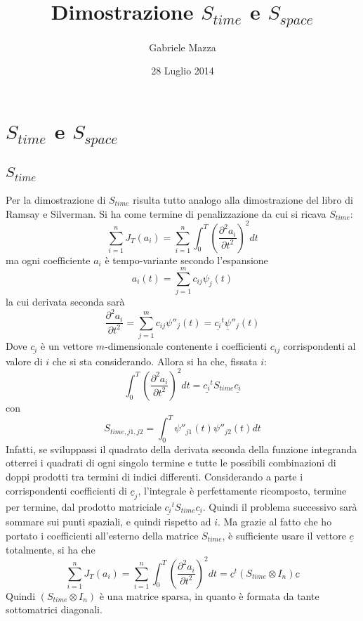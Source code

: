 \documentclass[a4paper,12pt]{report}							%
\date{28 Luglio 2014}
\author{Gabriele Mazza}
\title{Dimostrazione $S_{time}$ e $S_{space}$}
\begin{document}

\chapter{$S_{time}$ e $S_{space}$}

\section{$S_{time}$}
Per la dimostrazione di $S_{time}$ risulta tutto analogo alla dimostrazione del libro di Ramsay e Silverman.
\newline
Si ha come termine di penalizzazione da cui si ricava $S_{time}$:
$$
\sum_{i=1}^n J_T(a_i)=\sum_{i=1}^n \int_0^T (\frac{\partial^2a_i}{\partial t^2})^2 dt
$$
ma ogni coefficiente $a_i$ è tempo-variante secondo l'espansione
$$
a_i(t)=\sum_{j=1}^m c_{ij}\psi_j(t)
$$
la cui derivata seconda sarà
$$
\frac{\partial^2a_i}{\partial t^2}=\sum_{j=1}^m c_{ij}\psi''_j(t)= \underline{c_i}^t\underline{\psi}''_j(t) 
$$
Dove $\underline{c_i}$ è un vettore $m$-dimensionale contenente i coefficienti $c_{ij}$ corrispondenti al valore di $i$ che si sta considerando.
\newline
Allora si ha che, fissata $i$:
$$
\int_0^T (\frac{\partial^2a_i}{\partial t^2})^2 dt = \underline{c_i}^t S_{time} \underline{c_i}
$$
con
$$
S_{time,j1,j2}=\int_0^T\psi''_{j1}(t)\psi''_{j2}(t)dt
$$
Infatti, se sviluppassi il quadrato della derivata seconda della funzione integranda otterrei i quadrati
di ogni singolo termine e tutte le possibili combinazioni di doppi prodotti tra termini di indici differenti. Considerando a parte i corrispondenti coefficienti di $\underline{c}_j$, l'integrale è perfettamente ricomposto, termine per termine, dal prodotto matriciale $\underline{c_i}^t S_{time} \underline{c_i}$.
\newline
\newline
Quindi il problema successivo sarà sommare sui punti spaziali, e quindi rispetto ad $i$. Ma grazie al fatto che ho portato i coefficienti all'esterno della matrice $S_{time}$, è sufficiente usare il vettore $\underline{c}$ totalmente, si ha che
$$
\sum_{i=1}^n J_T(a_i)=\sum_{i=1}^n \int_0^T (\frac{\partial^2a_i}{\partial t^2})^2 dt=\underline{c}^t (S_{time}\otimes I_n) \underline{c}
$$
Quindi $(S_{time}\otimes I_n)$ è una matrice sparsa, in quanto è formata da tante sottomatrici diagonali.
\end{document}
